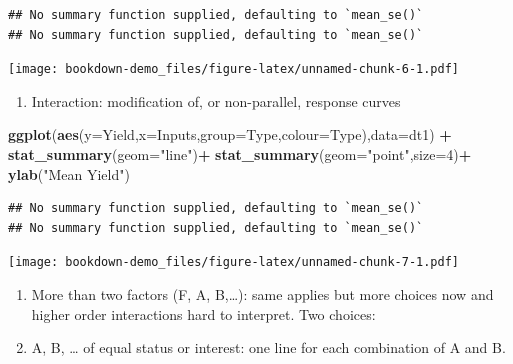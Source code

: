 \documentclass[
]{book}
\newenvironment{Shaded}{\begin{snugshade}}{\end{snugshade}}
\newcommand{\DataTypeTok}[1]{\textcolor[rgb]{0.13,0.29,0.53}{#1}}
\newcommand{\DecValTok}[1]{\textcolor[rgb]{0.00,0.00,0.81}{#1}}
\newcommand{\KeywordTok}[1]{\textcolor[rgb]{0.13,0.29,0.53}{\textbf{#1}}}
\newcommand{\NormalTok}[1]{#1}
\newcommand{\OperatorTok}[1]{\textcolor[rgb]{0.81,0.36,0.00}{\textbf{#1}}}
\newcommand{\StringTok}[1]{\textcolor[rgb]{0.31,0.60,0.02}{#1}}
\providecommand{\tightlist}{%
  \setlength{\itemsep}{0pt}\setlength{\parskip}{0pt}}
\begin{document}
\begin{verbatim}
## No summary function supplied, defaulting to `mean_se()`
## No summary function supplied, defaulting to `mean_se()`
\end{verbatim}

\texttt{[image: bookdown-demo\_files/figure-latex/unnamed-chunk-6-1.pdf]}

\begin{enumerate}
\def\labelenumi{\arabic{enumi}.}
\setcounter{enumi}{2}
\tightlist
\item
  Interaction: modification of, or non-parallel, response curves
\end{enumerate}

\begin{Shaded}
\begin{Highlighting}[]
\KeywordTok{ggplot}\NormalTok{(}\KeywordTok{aes}\NormalTok{(}\DataTypeTok{y=}\NormalTok{Yield,}\DataTypeTok{x=}\NormalTok{Inputs,}\DataTypeTok{group=}\NormalTok{Type,}\DataTypeTok{colour=}\NormalTok{Type),}\DataTypeTok{data=}\NormalTok{dt1) }\OperatorTok{+}
\StringTok{  }\KeywordTok{stat_summary}\NormalTok{(}\DataTypeTok{geom=}\StringTok{"line"}\NormalTok{)}\OperatorTok{+}
\StringTok{    }\KeywordTok{stat_summary}\NormalTok{(}\DataTypeTok{geom=}\StringTok{"point"}\NormalTok{,}\DataTypeTok{size=}\DecValTok{4}\NormalTok{)}\OperatorTok{+}
\StringTok{      }\KeywordTok{ylab}\NormalTok{(}\StringTok{"Mean Yield"}\NormalTok{)}
\end{Highlighting}
\end{Shaded}

\begin{verbatim}
## No summary function supplied, defaulting to `mean_se()`
## No summary function supplied, defaulting to `mean_se()`
\end{verbatim}

\texttt{[image: bookdown-demo\_files/figure-latex/unnamed-chunk-7-1.pdf]}

\begin{enumerate}
\def\labelenumi{\arabic{enumi}.}
\setcounter{enumi}{3}
\tightlist
\item
  More than two factors (F, A, B,\ldots): same applies but more choices now and higher order interactions hard to interpret. Two choices:
\item
  A, B, \ldots{} of equal status or interest: one line for each combination of A and B.
\end{enumerate}
\end{document}
